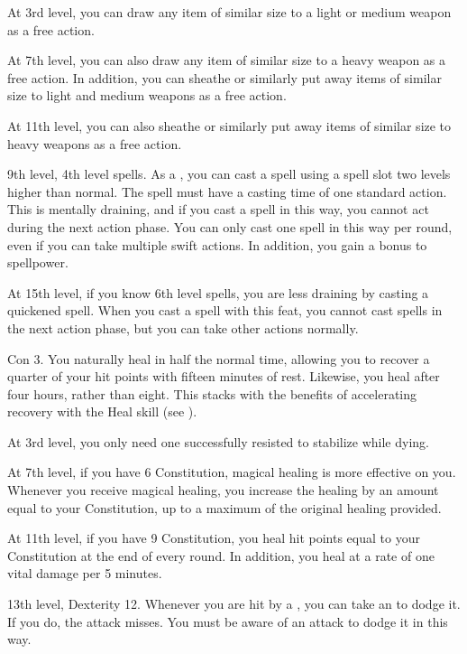     At 3rd level, you can draw any item of similar size to a light or medium weapon as a free action.

    At 7th level, you can also draw any item of similar size to a heavy weapon as a free action.
    In addition, you can sheathe or similarly put away items of similar size to light and medium weapons as a free action.

    At 11th level, you can also sheathe or similarly put away items of similar size to heavy weapons as a free action.

    \featpre 9th level, 4th level spells.
    \featben As a , you can cast a spell using a spell slot two levels higher than normal.
    The spell must have a casting time of one standard action.
    This is mentally draining, and if you cast a spell in this way, you cannot act during the next action phase.
    You can only cast one spell in this way per round, even if you can take multiple swift actions.
    In addition, you gain a  bonus to spellpower.

    At 15th level, if you know 6th level spells, you are less draining by casting a quickened spell.
    When you cast a spell with this feat, you cannot cast spells in the next action phase, but you can take other actions normally.

    \featpre Con 3.
    \featben You naturally heal in half the normal time, allowing you to recover a quarter of your hit points with fifteen minutes of rest.
    Likewise, you heal  after four hours, rather than eight.
    This stacks with the benefits of accelerating recovery with the Heal skill (see ).

    At 3rd level, you only need one successfully resisted  to stabilize while dying.

    At 7th level, if you have 6 Constitution, magical healing is more effective on you.
    Whenever you receive magical healing, you increase the healing by an amount equal to your Constitution, up to a maximum of the original healing provided.

    At 11th level, if you have 9 Constitution, you heal hit points equal to your Constitution at the end of every round.
    In addition, you heal  at a rate of one vital damage per 5 minutes.
    \magical

    \featpres 13th level, Dexterity 12.
    \featben Whenever you are hit by a , you can take an  to dodge it.
    If you do, the attack misses.
    You must be aware of an attack to dodge it in this way.

